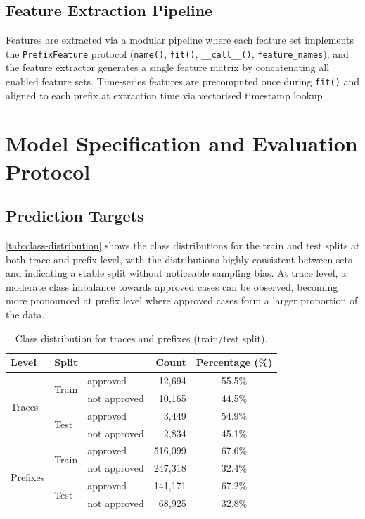 \documentclass[runningheads]{llncs}
\begin{document}
\subsection{Feature Extraction Pipeline}
\label{sec:extraction}

Features are extracted via a modular pipeline where each feature set implements the
\texttt{PrefixFeature} protocol (\texttt{name()}, \texttt{fit()},
\texttt{\_\_call\_\_()}, \texttt{feature\_names}), and the feature extractor
generates a single feature matrix by concatenating all enabled feature sets.
Time-series features are precomputed once during \texttt{fit()} and aligned
to each prefix at extraction time via vectorised timestamp lookup.

\section{Model Specification and Evaluation Protocol}
\label{sec:models}

\subsection{Prediction Targets}
\label{sec:tasks}
\autoref{tab:class-distribution} shows the class distributions for the train and test splits at both trace and prefix level, with the distributions highly consistent between sets and indicating a stable split without noticeable sampling bias. At trace level, a moderate class imbalance towards approved cases can be observed, becoming more pronounced at prefix level where approved cases form a larger proportion of the data.

\begin{table}[H]
    \centering
    \caption{Class distribution for traces and prefixes (train/test split).}
    \label{tab:class-distribution}
    \begin{tabular}{l l l r c}
        \toprule
        Level & Split & & Count & Percentage (\%) \\
        \midrule
        \multirow{4}{*}{Traces}
         & \multirow{2}{*}{Train} & approved & 12,694 & 55.5\% \\
         & & not approved & 10,165 & 44.5\% \\
         \cmidrule(lr){2-5}
         & \multirow{2}{*}{Test} & approved & 3,449 & 54.9\% \\
         & & not approved & 2,834 & 45.1\% \\
        \midrule
        \multirow{4}{*}{Prefixes}
         & \multirow{2}{*}{Train} & approved & 516,099 & 67.6\% \\
         & & not approved & 247,318 & 32.4\%  \\
         \cmidrule(lr){2-5}
         & \multirow{2}{*}{Test} & approved & 141,171 & 67.2\% \\
         & & not approved & 68,925 & 32.8\% \\
        \bottomrule
    \end{tabular}
\end{table}
\end{document}
